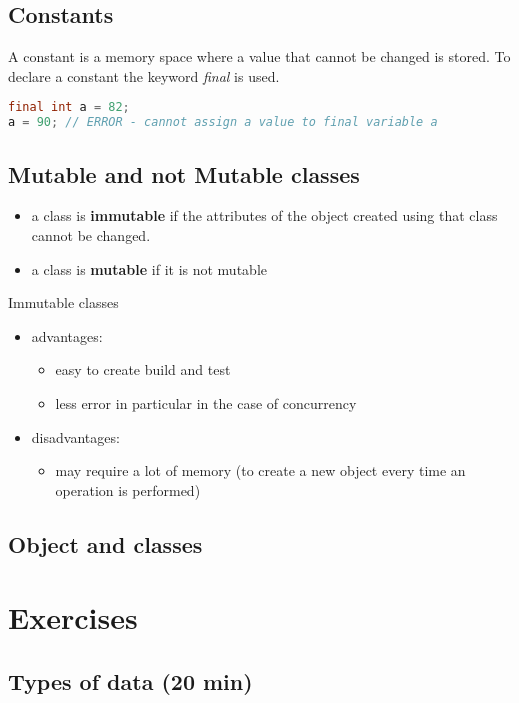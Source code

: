 \documentclass{article}
\begin{document}
\subsection{Constants}
A constant is a memory space where a value that cannot be changed is stored. To declare a constant the keyword \emph{final} is used.

\begin{lstlisting}[language=Java,escapechar=|]
final int a = 82;
a = 90; // ERROR - cannot assign a value to final variable a
\end{lstlisting}

\subsection{Mutable and not Mutable classes}
\begin{itemize}
\item a class is \textbf{immutable} if the attributes of the object created using that class cannot be changed.
\item a class is \textbf{mutable} if it is not mutable
\end{itemize}

Immutable classes
\begin{itemize}
\item advantages:
\begin{itemize}
\item easy to create build and test
\item less error in particular in the case of concurrency
\end{itemize}
\item disadvantages:
\begin{itemize}
\item may require a lot of memory (to create a new object every time an operation is performed)
\end{itemize}
\end{itemize}

\subsection{Object and classes}


\section{Exercises}


\subsection{Types of data (20 min)} 
\end{document}
